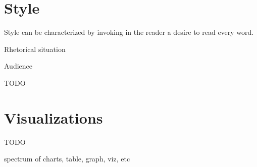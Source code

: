 \documentclass[10pt,a4paper]{book}
\begin{document}
\chapter{Style}\label{Style}


Style can be characterized by invoking in the reader a desire to read every word.

Rhetorical situation

Audience

\color{BrickRed}TODO\color{black}


\chapter{Visualizations}\label{Visualizations}

\color{BrickRed}TODO\color{black}

spectrum of charts, table, graph, viz, etc




\end{document}
